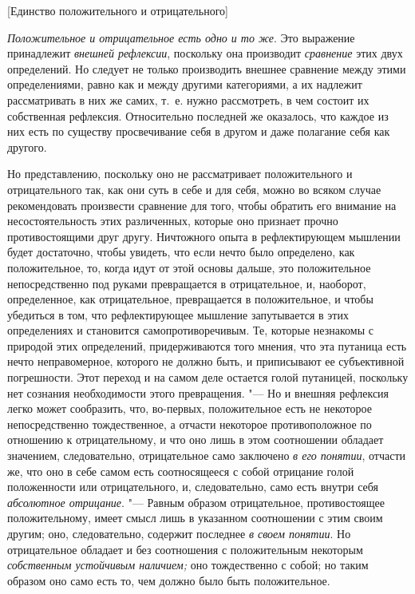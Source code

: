 %
  {[Единство положительного и отрицательного]}

{\em Положительное и отрицательное есть одно и то же}.
Это выражение принадлежит {\em внешней рефлексии},
поскольку она производит {\em сравнение} этих двух
определений. Но следует не только производить внешнее сравнение между этими
определениями, равно как и между другими категориями, а их надлежит
рассматривать в них же самих, т.~е. нужно рассмотреть, в чем состоит их
собственная рефлексия. Относительно последней же оказалось, что каждое из
них есть по существу просвечивание себя в другом и даже полагание себя как
другого.

Но представлению, поскольку оно не рассматривает положительного и
отрицательного так, как они суть в себе и для себя, можно во всяком случае
рекомендовать произвести сравнение для того, чтобы обратить его внимание на
несостоятельность этих различенных, которые оно признает прочно
противостоящими друг другу. Ничтожного опыта в рефлектирующем мышлении
будет достаточно, чтобы увидеть, что если нечто было определено, как
положительное, то, когда идут от этой основы дальше, это положительное
непосредственно под руками превращается в отрицательное, и, наоборот,
определенное, как отрицательное, превращается в положительное, и чтобы
убедиться в том, что рефлектирующее мышление запутывается в этих
определениях и становится самопротиворечивым. Те, которые незнакомы с
природой этих определений, придерживаются того мнения, что эта путаница
есть нечто неправомерное, которого не должно быть, и приписывают ее
субъективной погрешности. Этот переход и на самом деле остается голой
путаницей, поскольку нет сознания необходимости этого превращения. "--- Но и
внешняя рефлексия легко может сообразить, что, во-первых, положительное
есть не некоторое непосредственно тождественное, а отчасти некоторое
противоположное по отношению к отрицательному, и что оно лишь в этом
соотношении обладает значением, следовательно, отрицательное само заключено
{\em в его понятии}, отчасти
же, что оно в себе самом есть соотносящееся с собой отрицание голой
положенности или отрицательного, и, следовательно, само есть внутри себя
{\em абсолютное отрицание}. "--- Равным образом
отрицательное, противостоящее положительному, имеет смысл лишь в указанном
соотношении с этим своим другим; оно, следовательно, содержит последнее
{\em в своем понятии}. Но отрицательное обладает и без
соотношения с положительным некоторым {\em собственным
устойчивым наличием;} оно тождественно с собой; но таким образом оно само
есть то, чем должно было быть положительное.

